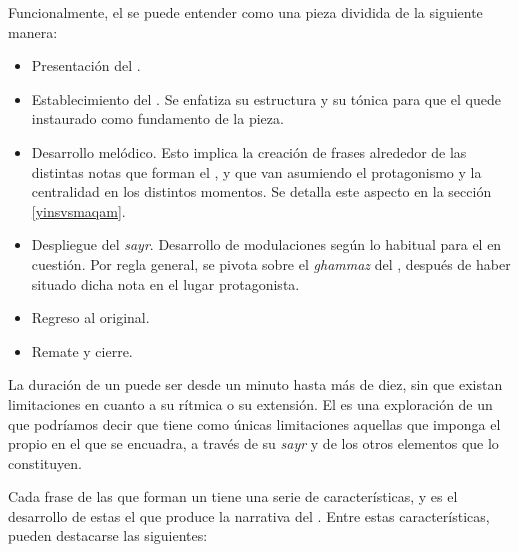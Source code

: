 Funcionalmente, el \taqsim se puede entender como una pieza dividida de la siguiente manera:

\begin{itemize}
\item Presentación del \maqamb.
\item Establecimiento del \maqamb. Se enfatiza su estructura y su tónica para que el \maqam quede instaurado como fundamento de la pieza.
\item Desarrollo melódico. Esto implica la creación de frases alrededor de las distintas notas que forman el \maqamb, y que van asumiendo el protagonismo y la centralidad en los distintos momentos. Se detalla este aspecto en la sección \ref{yinsvsmaqam}.
\item Despliegue del \emph{sayr}. Desarrollo de modulaciones según lo habitual para el \maqam en cuestión. Por regla general, se pivota sobre el \emph{ghammaz} del \maqamb, después de haber situado dicha nota en el lugar protagonista.
\item Regreso al \maqam original.
\item Remate y cierre.
\end{itemize}

La duración de un \taqsim puede ser desde un minuto hasta más de diez, sin que existan limitaciones en cuanto a su rítmica o su extensión. El \taqsim es una exploración de un \maqam que podríamos decir que tiene como únicas limitaciones aquellas que imponga el propio \maqam en el que se encuadra, a través de su \emph{sayr} y de los otros elementos que lo constituyen.

Cada frase de las que forman un \taqsim tiene una serie de características, y es el desarrollo de estas el que produce la narrativa del \taqsimb. Entre estas características, pueden destacarse las siguientes:

